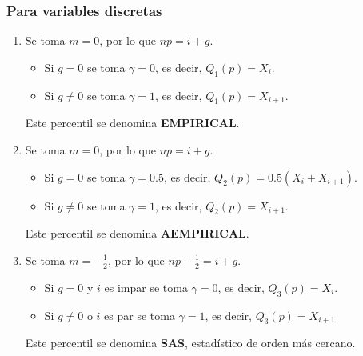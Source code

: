 \subsubsection{Para variables discretas}
\begin{enumerate}
    \item Se toma $m=0$, por lo que $np = i + g$.
        \begin{itemize}
            \item Si $g=0$ se toma $\gamma=0$, es decir, $Q_1(p) = X_i$.
            \item Si $g\neq0$ se toma $\gamma=1$, es decir, $Q_1(p) = X_{i+1}$.
        \end{itemize}
        Este percentil se denomina \textbf{EMPIRICAL}.
    \item Se toma $m=0$, por lo que $np = i + g$.
        \begin{itemize}
            \item Si $g=0$ se toma $\gamma=0.5$, es decir, $Q_2(p) = 0.5(X_i + X_{i+1})$.
            \item Si $g\neq 0$ se toma $\gamma=1$, es decir, $Q_2(p) = X_{i+1}$.
        \end{itemize}
        Este percentil se denomina \textbf{AEMPIRICAL}.
    \item Se toma $m=-\frac{1}{2}$, por lo que $np - \frac{1}{2} = i+g$.
        \begin{itemize}
            \item Si $g=0$ y $i$ es impar se toma $\gamma=0$, es decir, $Q_3(p) = X_i$.
            \item Si $g\neq 0$ o $i$ es par se toma $\gamma=1$, es decir, $Q_3(p) = X_{i+1}$
        \end{itemize}
        Este percentil se denomina \textbf{SAS}, estadístico de orden más cercano.
\end{enumerate}
